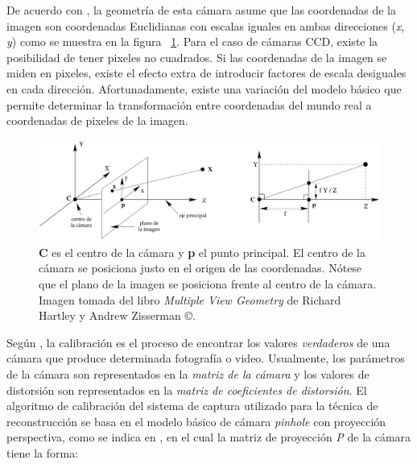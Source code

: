 De acuerdo con \cite{Hartley_Zisserman_2003,Faugeras_Luong_2001}, la geometr\'{i}a de esta c\'{a}mara asume que las coordenadas de la imagen son coordenadas Euclidianas con escalas iguales en ambas direcciones (\textit{x}, \textit{y}) como se muestra en la figura ~\ref{fig:Pinhole2}. Para el caso de c\'{a}maras \ac{CCD}, existe la posibilidad de tener pixeles no cuadrados. Si las coordenadas de la imagen se miden en pixeles, existe el efecto extra de introducir factores de escala desiguales en cada direcci\'{o}n. Afortunadamente, existe una variaci\'{o}n del modelo b\'{a}sico que permite determinar la transformaci\'{o}n entre coordenadas del mundo real a coordenadas de pixeles de la imagen.


\begin{figure}[H]
\centering
\includegraphics[width=1.0\textwidth]{images/pinhole.png}
\caption[Geometr\'{i}a de la c\'{a}mara \textit{pinhole}]%
{\textbf{C} es el centro de la c\'{a}mara y \textbf{p} el punto principal. El centro de la c\'{a}mara se posiciona justo en el origen de las coordenadas. N\'{o}tese que el plano de la imagen se posiciona frente al centro de la c\'{a}mara. Imagen tomada del libro \textit{Multiple View Geometry} de Richard Hartley y Andrew Zisserman \copyright \cite{Hartley_Zisserman_2003}.}
\label{fig:Pinhole2}
\end{figure}


Seg\'{u}n \cite{Szeliski_2010,Shah_1983}, la calibraci\'{o}n es el proceso de encontrar los valores \textit{verdaderos} de una c\'{a}mara que produce determinada fotograf\'{i}a o video. Usualmente, los par\'{a}metros de la c\'{a}mara son representados en la \textit{matriz de la c\'{a}mara} y los valores de distorsi\'{o}n son representados en la \textit{matriz de coeficientes de distorsi\'{o}n}. El algoritmo de calibraci\'{o}n del sistema de captura utilizado para la t\'{e}cnica de reconstrucci\'{o}n se basa en el modelo b\'{a}sico de c\'{a}mara \textit{pinhole} con proyecci\'{o}n perspectiva, como se indica en \cite{Hartley_Zisserman_2003}, en el cual la matriz de proyecci\'{o}n \textit{P} de la c\'{a}mara tiene la forma:

